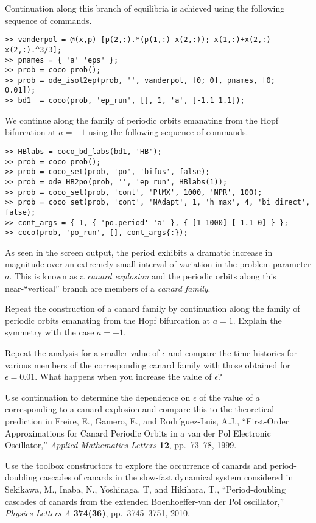 Continuation along this branch of equilibria is achieved using the following sequence of commands.
\begin{lstlisting}[language=coco-highlight]
>> vanderpol = @(x,p) [p(2,:).*(p(1,:)-x(2,:)); x(1,:)+x(2,:)-x(2,:).^3/3];
>> pnames = { 'a' 'eps' };
>> prob = coco_prob();
>> prob = ode_isol2ep(prob, '', vanderpol, [0; 0], pnames, [0;  0.01]);
>> bd1  = coco(prob, 'ep_run', [], 1, 'a', [-1.1 1.1]);
\end{lstlisting}
We continue along the family of periodic orbits emanating from the Hopf bifurcation at $a=-1$ using the following sequence of commands.
\begin{lstlisting}[language=coco-highlight]
>> HBlabs = coco_bd_labs(bd1, 'HB');
>> prob = coco_prob();
>> prob = coco_set(prob, 'po', 'bifus', false);
>> prob = ode_HB2po(prob, '', 'ep_run', HBlabs(1));
>> prob = coco_set(prob, 'cont', 'PtMX', 1000, 'NPR', 100);
>> prob = coco_set(prob, 'cont', 'NAdapt', 1, 'h_max', 4, 'bi_direct', false);
>> cont_args = { 1, { 'po.period' 'a' }, { [1 1000] [-1.1 0] } };
>> coco(prob, 'po_run', [], cont_args{:});
\end{lstlisting}
As seen in the screen output, the period exhibits a dramatic increase in magnitude over an extremely small interval of variation in the problem parameter $a$. This is known as a \emph{canard explosion} and the periodic orbits along this near-``vertical'' branch are members of a \emph{canard family}.\\
\medskip

\begin{exercises}

\item Repeat the construction of a canard family by continuation along the family of periodic orbits emanating from the Hopf bifurcation at $a=1$. Explain the symmetry with the case $a=-1$.

\item Repeat the analysis for a smaller value of $\epsilon$ and compare the time histories for various members of the corresponding canard family with those obtained for $\epsilon=0.01$. What happens when you increase the value of $\epsilon$?

\item Use continuation to determine the dependence on $\epsilon$ of the value of $a$ corresponding to a canard explosion and compare this to the theoretical prediction in Freire, E., Gamero, E., and Rodr\'{i}guez-Luis, A.J., ``First-Order Approximations for Canard Periodic Orbits in a van der Pol Electronic Oscillator,'' \emph{Applied Mathematics Letters} \textbf{12}, pp.~73--78, 1999.

\item Use the  toolbox constructors to explore the occurrence of canards and period-doubling cascades of canards in the slow-fast dynamical system considered in Sekikawa, M., Inaba, N., Yoshinaga, T, and Hikihara, T., ``Period-doubling cascades of canards from the extended Boenhoeffer-van der Pol oscillator,'' \emph{Physics Letters A} \textbf{374(36)}, pp.~3745--3751, 2010.

\end{exercises}

